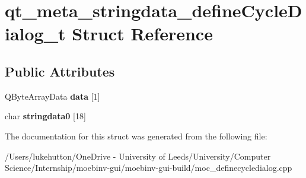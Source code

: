 \hypertarget{structqt__meta__stringdata__define_cycle_dialog__t}{}\section{qt\+\_\+meta\+\_\+stringdata\+\_\+define\+Cycle\+Dialog\+\_\+t Struct Reference}
\label{structqt__meta__stringdata__define_cycle_dialog__t}
\subsection*{Public Attributes}
\begin{DoxyCompactItemize}
\item 
\mbox{\label{structqt__meta__stringdata__define_cycle_dialog__t_a5f5ff34ca5ca0e327d7051d2ce9d52d5}} 
Q\+Byte\+Array\+Data {\bfseries data} \mbox{[}1\mbox{]}
\item 
\mbox{\label{structqt__meta__stringdata__define_cycle_dialog__t_a6c71a93ad424fda6c7d2839ff9f1026f}} 
char {\bfseries stringdata0} \mbox{[}18\mbox{]}
\end{DoxyCompactItemize}


The documentation for this struct was generated from the following file\+:\begin{DoxyCompactItemize}
\item 
/\+Users/lukehutton/\+One\+Drive -\/ University of Leeds/\+University/\+Computer Science/\+Internship/moebinv-\/gui/moebinv-\/gui-\/build/moc\+\_\+definecycledialog.\+cpp\end{DoxyCompactItemize}
